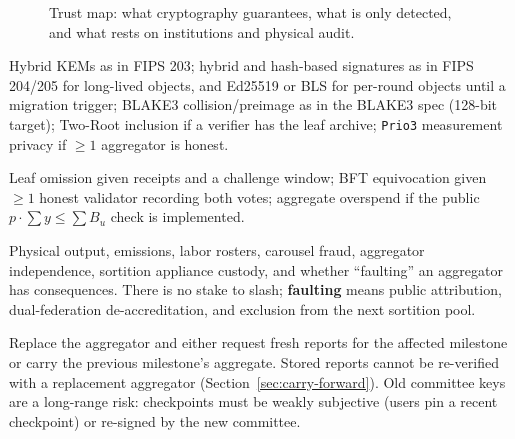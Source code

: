\documentclass[10pt,twoside,openany]{book}
\theoremstyle{dpepstyle}
\begin{document}
\begin{figure}[htbp]
\caption{Trust map: what cryptography guarantees, what is only detected, and what rests on institutions and physical audit.}
\label{fig:trust-map}
\end{figure}
\begin{description}[leftmargin=1.4em,itemsep=2pt]
  \item[Holds under stated assumptions.] Hybrid KEMs as in FIPS 203; hybrid and hash-based signatures as in FIPS 204/205 for long-lived objects, and Ed25519 or BLS for per-round objects until a migration trigger; BLAKE3 collision/preimage as in the BLAKE3 spec (128-bit target); Two-Root inclusion if a verifier has the leaf archive; \texttt{Prio3} measurement privacy if $\ge 1$ aggregator is honest.
  \item[Detected, not prevented.] Leaf omission given receipts and a challenge window; BFT equivocation given $\ge 1$ honest validator recording both votes; aggregate overspend if the public $p\cdot\sum y\le\sum B_u$ check is implemented.
  \item[Depends on social institutions.] Physical output, emissions, labor rosters, carousel fraud, aggregator independence, sortition appliance custody, and whether ``faulting'' an aggregator has consequences. There is no stake to slash; \textbf{faulting} means public attribution, dual-federation de-accreditation, and exclusion from the next sortition pool.
  \item[Aggregator compromise.] Replace the aggregator and either request fresh reports for the affected milestone or carry the previous milestone's aggregate. Stored reports cannot be re-verified with a replacement aggregator (Section~\ref{sec:carry-forward}). Old committee keys are a long-range risk: checkpoints must be weakly subjective (users pin a recent checkpoint) or re-signed by the new committee.

\end{description}
\end{document}
